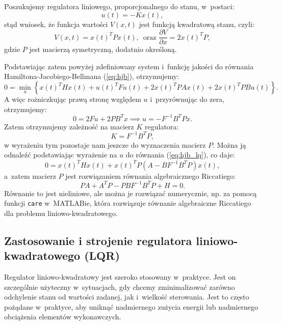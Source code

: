 \documentclass{article}
\begin{document}
    Poszukujemy regulatora liniowego, proporcjonalnego do stanu, w~postaci:
    \[
        u(t) = -Kx(t),
    \]
    stąd wniosek, że funkcja wartości $V(x,t)$ jest funkcją kwadratową stanu, czyli:
    \[
    V(x,t) = x(t)^{T}Px(t),\,\text{ oraz } \frac{\partial V}{\partial x} = 2x(t)^{T}P,
    \]
    gdzie $P$ jest macierzą symetryczną, dodatnio określoną.

    Podstawiając zatem powyżej zdefiniowany system i~funkcję
    jakości do równania Hamiltona-Jacobiego-Bellmana (\ref{eq:hjb}),
    otrzymujemy:
    \begin{equation}
        \label{eq:hjb_lq}
        0 = \min_{u} \left\{ 
            x(t)^{T}Hx(t) + u(t)^{T}Fu(t)
            +
            2x(t)^{T}PAx(t) + 2x(t)^{T}PB u(t)
            \right\}.
    \end{equation}
    A więc rożniczkując prawą stronę względem $u$ i~przyrównując do zera,
    otrzymujemy:
    \[
        0 = 2Fu + 2PB^{T}x \implies u = -F^{-1}B^{T}Px.
    \]
    Zatem otrzymujemy zależność na macierz $K$ regulatora:
    \begin{equation}
        \label{eq:K_lq}
        K = F^{-1}B^{T}P,
    \end{equation}
    w wyrażeniu tym pozostaje nam jeszcze do wyznaczenia macierz $P$.
    Można ją odnaleźć podstawiając wyrażenie na $u$ do równania
    (\ref{eq:hjb_lq}), co daje:
    \[
        0 = x(t)^{T}Hx(t) + x(t)^{T}P\left( A - BF^{-1}B^{T}P \right)x(t),
    \]
    a~zatem macierz $P$ jest rozwiązaniem równania algebraicznego Riccatiego:
    \begin{equation}
        \label{eq:riccati}
        PA + A^{T}P - PBF^{-1}B^{T}P + H = 0.
    \end{equation}
    Równanie to jest nieliniowe, ale można je rozwiązać numerycznie,
    np. za pomocą funkcji \texttt{care} w~MATLABie, która rozwiązuje
    równanie algebraiczne Riccatiego dla problemu liniowo-kwadratowego.

    \subsection{Zastosowanie i strojenie regulatora liniowo-kwadratowego (LQR)}
    Regulator liniowo-kwadratowy jest szeroko stosowany w~praktyce.
    Jest on szczególnie użyteczny w~sytuacjach, gdy chcemy zminimalizować
    zarówno odchylenie stanu od wartości zadanej, jak i~wielkość
    sterowania. Jest to często pożądane w~praktyce, aby uniknąć nadmiernego
    zużycia energii lub nadmiernego obciążenia elementów wykonawczych.
    
\end{document}
